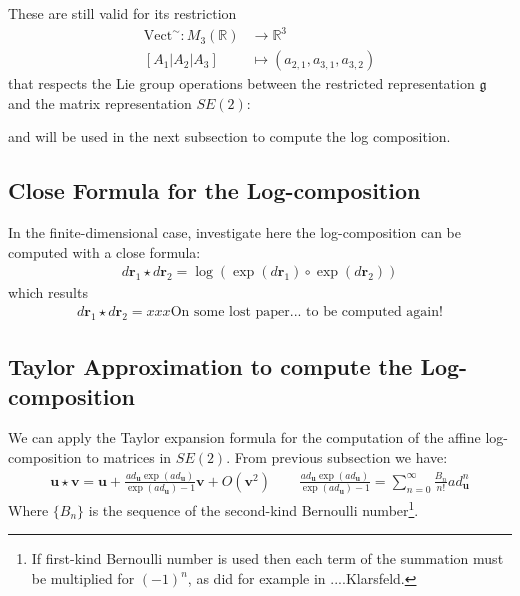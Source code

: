 These are still valid for its restriction 
\begin{align*}
\text{Vect}^{\sim} : M_{3}(\mathbb{R}) & \longrightarrow \mathbb{R}^{3}\\
[A_1 \big| A_2  \big| A_3]
&\longmapsto  
(a_{2,1}, a_{3,1}, a_{3,2})
\end{align*}
that respects the Lie group operations between the restricted representation $\mathfrak{g}$ and the matrix representation $SE(2)$:


and will be used in the next subsection to compute the log composition.













\subsection{Close Formula for the Log-composition}
In the finite-dimensional case, investigate here the log-composition can be computed with a close formula:
\begin{align*}
d\mathbf{r}_{1}\star d\mathbf{r}_{2} =  \log(\exp(d\mathbf{r}_1)\circ \exp(d\mathbf{r}_2)) 
\end{align*}
which results
\begin{align*}
d\mathbf{r}_{1}\star d\mathbf{r}_{2} 
= 
xxx \text{On some lost paper... to be computed again!}
\end{align*}


\subsection{Taylor Approximation to compute the Log-composition}

We can apply the Taylor expansion formula for the computation of the affine log-composition to matrices in $SE(2)$.
From previous subsection we have:
\begin{align*}
\mathbf{u}\star \mathbf{v}  = \mathbf{u} + \frac{ ad_{\mathbf{u}} \exp(ad_{\mathbf{u}}) }{ \exp(ad_{\mathbf{u}}) - 1 }  \mathbf{v} + O({\mathbf{v}}^2)
\qquad
\frac{ ad_{\mathbf{u}} \exp(ad_{\mathbf{u}}) }{ \exp(ad_{\mathbf{u}}) - 1 }  = \sum_{n=0}^{\infty} \frac{B_{n}}{n!} ad_{\mathbf{u}}^{n} 
\end{align*}
Where $\lbrace B_{n} \rbrace $ is the sequence of the second-kind Bernoulli number\footnote{If first-kind Bernoulli number is used then each term of the summation must be multiplied for $(-1)^{n}$, as did for example in ....Klarsfeld.}.



